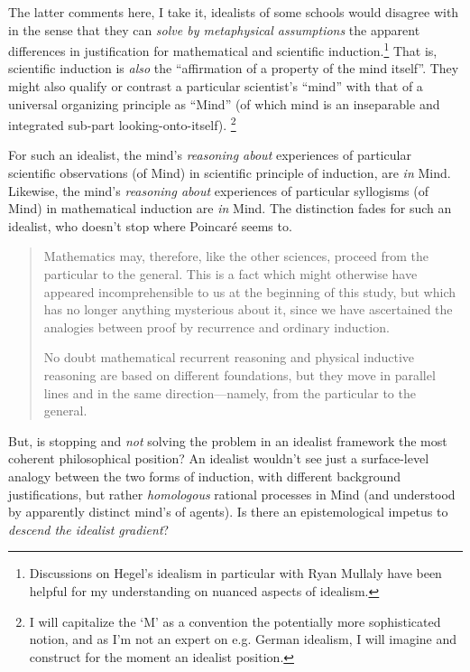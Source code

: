 The latter comments here, I take it, idealists of some schools would disagree with in the sense that they can \emph{solve by metaphysical assumptions} the apparent differences in justification for mathematical and scientific induction.\footnote{Discussions on Hegel's idealism in particular with Ryan Mullaly have been helpful for my understanding on nuanced aspects of idealism.}  That is, scientific induction is \emph{also} the ``affirmation of a property of the mind itself''.  They might also qualify or contrast a particular scientist's ``mind'' with that of a universal organizing principle as ``Mind'' (of which mind is an inseparable and integrated sub-part looking-onto-itself).  \footnote{I will capitalize the `M' as a convention the potentially more sophisticated notion, and as I'm not an expert on e.g. German idealism, I will imagine and construct for the moment an idealist position.}

For such an idealist, the mind's \emph{reasoning about} experiences of particular scientific observations (of Mind) in scientific principle of induction, are \emph{in} Mind.  Likewise, the mind's \emph{reasoning about} experiences of particular syllogisms (of Mind) in mathematical induction are \emph{in} Mind.  The distinction fades for such an idealist, who doesn't stop where Poincar\'e seems to.  

\begin{quote}
    Mathematics may, therefore, like the other sciences, proceed from the particular to the general.  This is a fact which might otherwise have appeared incomprehensible to us at the beginning of this study, but which has no longer anything mysterious about it, since we have ascertained the analogies between proof by recurrence and ordinary induction.
    
    No doubt mathematical recurrent reasoning and physical inductive reasoning are based on different foundations, but they move in parallel lines and in the same direction---namely, from the particular to the general.
    
    \citep[p. 14]{Poincare1952}
\end{quote}

But, is stopping and \emph{not} solving the problem in an idealist framework the most coherent philosophical position?  An idealist wouldn't see just a surface-level analogy between the two forms of induction, with different background justifications, but rather \emph{homologous} rational processes in Mind (and understood by apparently distinct mind's of agents).  Is there an epistemological impetus to \emph{descend the idealist gradient}?

